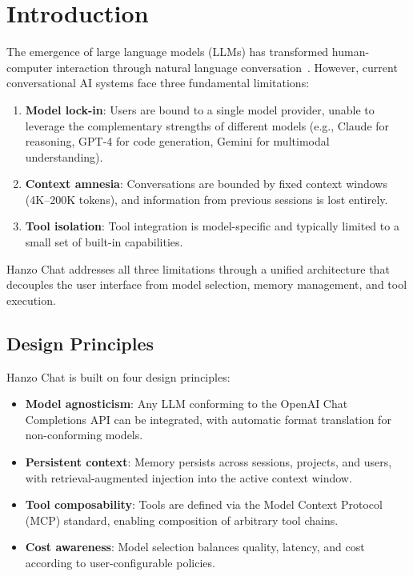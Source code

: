 \section{Introduction}

\label{sec:intro}

The emergence of large language models (LLMs) has transformed human-computer interaction through natural language conversation~\cite{openai2023gpt4,anthropic2024claude,google2024gemini}. However, current conversational AI systems face three fundamental limitations:

\begin{enumerate}[leftmargin=1.4em]
    \item \textbf{Model lock-in}: Users are bound to a single model provider, unable to leverage the complementary strengths of different models (e.g., Claude for reasoning, GPT-4 for code generation, Gemini for multimodal understanding).
    \item \textbf{Context amnesia}: Conversations are bounded by fixed context windows (4K--200K tokens), and information from previous sessions is lost entirely.
    \item \textbf{Tool isolation}: Tool integration is model-specific and typically limited to a small set of built-in capabilities.
\end{enumerate}

Hanzo Chat addresses all three limitations through a unified architecture that decouples the user interface from model selection, memory management, and tool execution.

\subsection{Design Principles}

Hanzo Chat is built on four design principles:

\begin{itemize}[leftmargin=1.1em]
    \item \textbf{Model agnosticism}: Any LLM conforming to the OpenAI Chat Completions API can be integrated, with automatic format translation for non-conforming models.
    \item \textbf{Persistent context}: Memory persists across sessions, projects, and users, with retrieval-augmented injection into the active context window.
    \item \textbf{Tool composability}: Tools are defined via the Model Context Protocol (MCP) standard, enabling composition of arbitrary tool chains.
    \item \textbf{Cost awareness}: Model selection balances quality, latency, and cost according to user-configurable policies.
\end{itemize}

